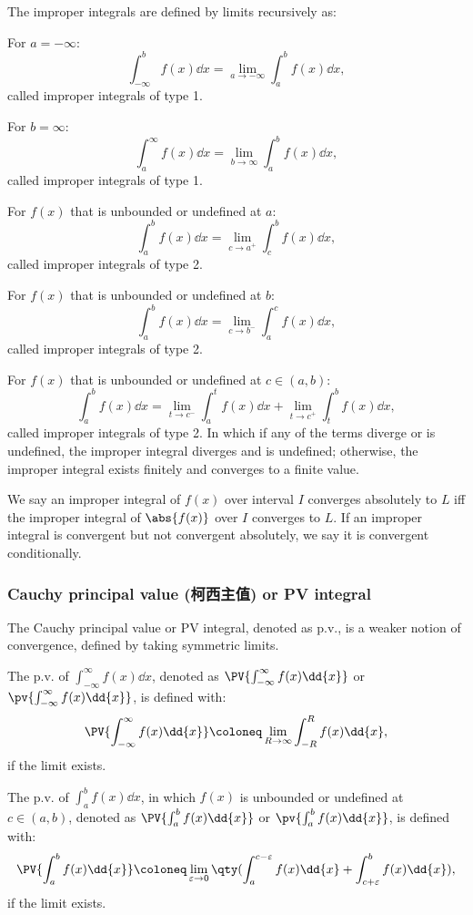 The improper integrals are defined by limits recursively as:
\bit
\item For $a=-\infty$:
\[\int _{-\infty }^bf(x)\dd{x}=\lim _{a\to -\infty }\int _{a}^{b}f(x)\dd{x},\]
called improper integrals of type 1.
\item For $b=\infty$:
\[\int _{a}^{\infty }f(x)\dd{x}=\lim _{b\to \infty }\int _{a}^{b}f(x)\dd{x},\]
called improper integrals of type 1.
\item For $f(x)$ that is unbounded or undefined at $a$:
\[\int_a^bf(x)\dd{x}=\lim_{c\to a^+}\int_c^bf(x)\dd{x},\]
called improper integrals of type 2.
\item For $f(x)$ that is unbounded or undefined at $b$:
\[\int_a^bf(x)\dd{x}=\lim_{c\to b^-}\int_a^cf(x)\dd{x},\]
called improper integrals of type 2.
\item For $f(x)$ that is unbounded or undefined at $c\in(a,b)$:
\[\int _{a}^{b}f(x)\dd{x}=\lim_{t\to c^-}\int _{a}^{t}f(x)\dd{x}+\lim_{t\to c^+}\int _{t}^{b}f(x)\dd{x},\]
called improper integrals of type 2.
\eit
In which if any of the terms diverge or is undefined, the improper integral diverges and is undefined; otherwise, the improper integral exists finitely and converges to a finite value.

We say an improper integral of $f(x)$ over interval $I$ converges absolutely to $L$ iff the improper integral of $\abs{f(x)}$ over $I$ converges to $L$. If an improper integral is convergent but not convergent absolutely, we say it is convergent conditionally.
\subsubsection{Cauchy principal value (柯西主值) or PV integral}
The Cauchy principal value or PV integral, denoted as p.v., is a weaker notion of convergence, defined by taking symmetric limits. 

The p.v. of $\int _{-\infty}^{\infty}f(x)\dd{x}$, denoted as $\PV{\int_{-\infty}^{\infty} f(x)\dd{x}}$ or $\pv{\int_{-\infty}^{\infty} f(x)\dd{x}}$, is defined with:
\[\PV{\int_{-\infty}^{\infty} f(x)\dd{x}}\coloneq\lim_{R\to\infty} \int_{-R}^{R} f(x)\dd{x},\]
if the limit exists.

The p.v. of $\int _{a}^{b}f(x)\dd{x}$, in which $f(x)$ is unbounded or undefined at $c\in (a,b)$, denoted as $\PV{\int_{a}^{b} f(x)\dd{x}}$ or $\pv{\int_{a}^{b} f(x)\dd{x}}$, is defined with:
\[\PV{\int_{a}^{b} f(x)\dd{x}}\coloneq\lim_{\varepsilon\to 0}\qty(\int_a^{c-\varepsilon}f(x)\dd{x}+\int_{c+\varepsilon}^bf(x)\dd{x}),\]
if the limit exists.

